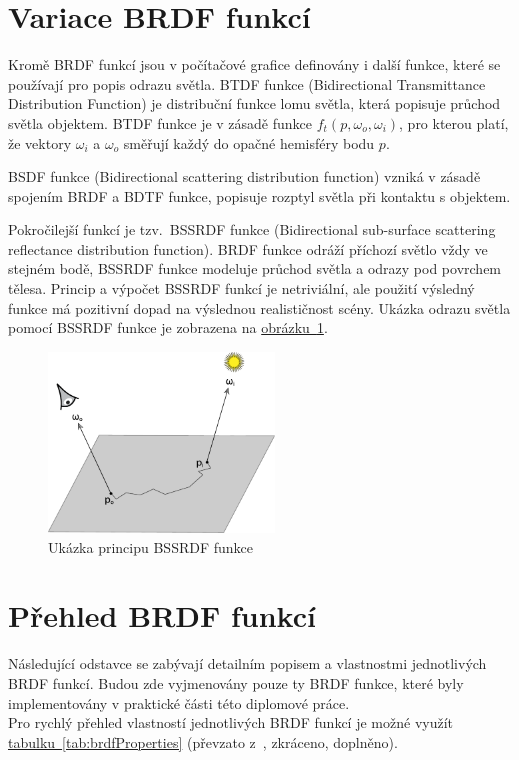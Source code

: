 \documentclass[czech,master]{diploma}
\newcommand{\point}{p}
\newcommand{\btdf}{f_t\left(\point,\omega_{o},\omega_{i}\right)}
\newcommand{\inVec}{\omega_{i}}
\newcommand{\outVec}{\omega_{o}}
\begin{document}
\section{Variace BRDF funkcí}
Kromě BRDF funkcí jsou v počítačové grafice definovány i další funkce, které se používají pro popis odrazu světla. BTDF funkce (Bidirectional Transmittance Distribution Function) je distribuční funkce lomu světla, která popisuje průchod světla objektem. BTDF funkce je v zásadě funkce \(\btdf\), pro kterou platí, že vektory \(\inVec\) a \(\outVec\) směřují každý do opačné hemisféry bodu \(\point\).\par
BSDF funkce (Bidirectional scattering distribution function) vzniká v zásadě spojením BRDF a BDTF funkce, popisuje rozptyl světla při kontaktu s objektem.\par
Pokročilejší funkcí je tzv.\ BSSRDF funkce (Bidirectional sub-surface scattering reflectance distribution function). BRDF funkce odráží příchozí světlo vždy ve stejném bodě, BSSRDF funkce modeluje průchod světla a odrazy pod povrchem tělesa. Princip a výpočet BSSRDF funkcí je netriviální, ale použití výsledný funkce má pozitivní dopad na výslednou realističnost scény. Ukázka odrazu světla pomocí BSSRDF funkce je zobrazena na \hyperref[fig:bssrdf]{obrázku~\ref{fig:bssrdf}}.

\begin{figure}[ht]
  \centering
  \includegraphics[width=6cm]{Figures/BSSRDF.pdf}%
  \caption[Ukázka principu BSSRDF funkce]{Ukázka principu BSSRDF funkce~\cite{PHARR2017313}}
  \label{fig:bssrdf}
\end{figure}

\section{Přehled BRDF funkcí}\label{sec:brdffunctions}
Následující odstavce se zabývají detailním popisem a vlastnostmi jednotlivých BRDF funkcí. Budou zde vyjmenovány pouze ty BRDF funkce, které byly implementovány v praktické části této diplomové práce. \\
Pro rychlý přehled vlastností jednotlivých BRDF funkcí je možné využít \hyperref[tab:brdfProperties]{tabulku~\ref{tab:brdfProperties}} (převzato z~\cite{BRDFOverview}, zkráceno, doplněno).
\end{document}
